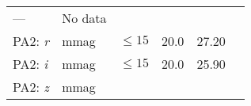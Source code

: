 \documentclass[DM,toc]{lsstdoc}
\begin{document}
\begin{longtable}[]{@{}llllll@{}}
\begin{minipage}[t]{0.12\columnwidth}
---\strut
\end{minipage} & \begin{minipage}[t]{0.17\columnwidth}\raggedright\strut
No data\strut
\end{minipage}\tabularnewline
\begin{minipage}[t]{0.14\columnwidth}\raggedright\strut
PA2: \emph{r}\strut
\end{minipage} & \begin{minipage}[t]{0.06\columnwidth}\raggedright\strut
mmag\strut
\end{minipage} & \begin{minipage}[t]{0.17\columnwidth}\raggedright\strut
\(\leq 15\)\strut
\end{minipage} & \begin{minipage}[t]{0.17\columnwidth}\raggedright\strut
20.0\strut
\end{minipage} & \begin{minipage}[t]{0.12\columnwidth}\raggedright\strut
27.20\strut
\end{minipage} & \begin{minipage}[t]{0.17\columnwidth}\raggedright\strut
\strut
\end{minipage}\tabularnewline
\begin{minipage}[t]{0.14\columnwidth}\raggedright\strut
PA2: \emph{i}\strut
\end{minipage} & \begin{minipage}[t]{0.06\columnwidth}\raggedright\strut
mmag\strut
\end{minipage} & \begin{minipage}[t]{0.17\columnwidth}\raggedright\strut
\(\leq 15\)\strut
\end{minipage} & \begin{minipage}[t]{0.17\columnwidth}\raggedright\strut
20.0\strut
\end{minipage} & \begin{minipage}[t]{0.12\columnwidth}\raggedright\strut
25.90\strut
\end{minipage} & \begin{minipage}[t]{0.17\columnwidth}\raggedright\strut
\strut
\end{minipage}\tabularnewline
\begin{minipage}[t]{0.14\columnwidth}\raggedright\strut
PA2: \emph{z}\strut
\end{minipage} & \begin{minipage}[t]{0.06\columnwidth}\raggedright\strut
mmag\strut
\end{minipage} & \begin{minipage}[t]{0.17\columnwidth}\raggedright\strut

\end{minipage}
\end{longtable}
\end{document}
